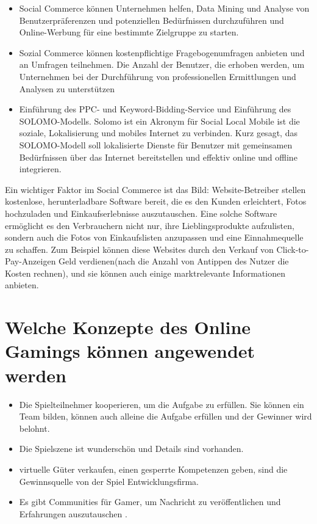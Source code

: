 \begin{itemize}
\begin{itemize}
\item Social Commerce können Unternehmen helfen, Data Mining und Analyse von Benutzerpräferenzen und potenziellen Bedürfnissen durchzuführen und Online-Werbung für eine bestimmte Zielgruppe zu starten.
\item Sozial Commerce können kostenpflichtige Fragebogenumfragen anbieten und an Umfragen teilnehmen. Die Anzahl der Benutzer, die erhoben werden, um Unternehmen bei der Durchführung von professionellen Ermittlungen und Analysen zu unterstützen
\item Einführung des PPC- und Keyword-Bidding-Service und Einführung des SOLOMO-Modells. Solomo ist ein Akronym für Social Local Mobile ist die soziale, Lokalisierung und mobiles Internet zu verbinden. Kurz gesagt, das SOLOMO-Modell soll lokalisierte Dienste für Benutzer mit gemeinsamen Bedürfnissen über das Internet bereitstellen und effektiv online und offline integrieren.
\end{itemize}

\end{itemize}

Ein wichtiger Faktor im Social Commerce ist das Bild: Website-Betreiber stellen kostenlose, herunterladbare Software bereit, die es den Kunden erleichtert, Fotos hochzuladen und Einkaufserlebnisse auszutauschen. Eine solche Software ermöglicht es den Verbrauchern nicht nur, ihre Lieblingsprodukte aufzulisten, sondern auch die Fotos von Einkaufslisten anzupassen und eine Einnahmequelle  zu schaffen. Zum Beispiel können diese Websites durch den Verkauf von Click-to-Pay-Anzeigen Geld verdienen(nach die Anzahl von Antippen des Nutzer die Kosten rechnen), und sie können auch einige marktrelevante Informationen anbieten.


\section{Welche Konzepte des Online Gamings können angewendet werden}

\begin{itemize}
\item Die Spielteilnehmer kooperieren, um die Aufgabe zu erfüllen. Sie können ein Team bilden, können auch alleine die Aufgabe erfüllen und der Gewinner wird belohnt.
\item Die Spielszene ist wunderschön und Details sind vorhanden.
\item virtuelle Güter verkaufen,  einen gesperrte Kompetenzen geben, sind die Gewinnsquelle von der Spiel Entwicklungsfirma.
\item Es gibt Communities für Gamer, um Nachricht zu veröffentlichen und Erfahrungen auszutauschen \parencite[S. 126]{warmelink}.
\end{itemize}
